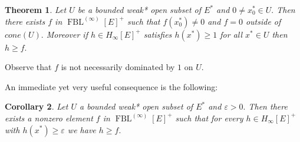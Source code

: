 \documentclass[12pt]{article}%
\newtheorem{theorem}{Theorem}
\newtheorem{corollary}[theorem]{Corollary}
\begin{document}
\begin{theorem}
\label{A}Let $U$ be a bounded weak* open subset of $E^{\ast}$ and $0\neq
x_{0}^{\ast}\in U.$ Then there exists $f$ in $\operatorname*{FBL}%
\nolimits^{(\infty)}\left[  E\right]  ^{+}$ such that $f\left(  x_{0}^{\ast
}\right)  \neq0$ and $f=0$ outside of $cone\left(  U\right)  .$ Moreover if
$h\in H_{\infty}\left[  E\right]  ^{+}$ satisfies $h\left(  x^{\ast}\right)
\geq1$ for all $x^{\ast}\in U$ then $h\geq f.$
\end{theorem}

Observe that $f$ is not necessarily dominated by $1$ on $U.$

An immediate yet very useful consequence is the following:

\begin{corollary}
\label{B}Let $U$ a bounded weak* open subset of $E^{\ast}$ and $\varepsilon
>0.$ Then there exists a nonzero element $f$ in $\operatorname*{FBL}%
\nolimits^{(\infty)}\left[  E\right]  ^{+}$ such that for every $h\in
H_{\infty}\left[  E\right]  ^{+}$ with $h\left(  x^{\ast}\right)
\geq\varepsilon$ we have $h\geq f.$
\end{corollary}
\end{document}
